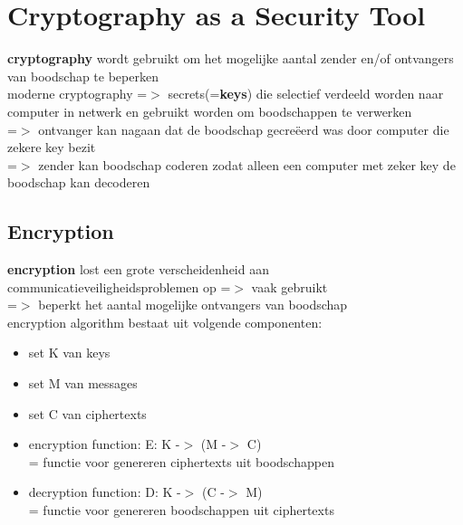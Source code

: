 \documentclass{report}
\begin{document}
\section{Cryptography as a Security Tool}
\textbf{cryptography} wordt gebruikt om het mogelijke aantal zender en/of ontvangers van boodschap te beperken
\\moderne cryptography =$>$ secrets(=\textbf{keys}) die selectief verdeeld worden naar computer in netwerk en gebruikt worden om boodschappen te verwerken
\\=$>$ ontvanger kan nagaan dat de boodschap gecre\"eerd was door computer die zekere key bezit
\\=$>$ zender kan boodschap coderen zodat alleen een computer met zeker key de boodschap kan decoderen

\subsection{Encryption}
\textbf{encryption} lost een grote verscheidenheid aan communicatieveiligheidsproblemen op =$>$ vaak gebruikt
\\=$>$ beperkt het aantal mogelijke ontvangers van boodschap
\\encryption algorithm bestaat uit volgende componenten:
\begin{itemize}
\item set K van keys
\item set M van messages
\item set C van ciphertexts
\item encryption function: E: K -$>$ (M -$>$ C)
\\= functie voor genereren ciphertexts uit boodschappen
\item decryption function: D: K -$>$ (C -$>$ M)
\\= functie voor genereren boodschappen uit ciphertexts
\end{itemize}
\end{document}

